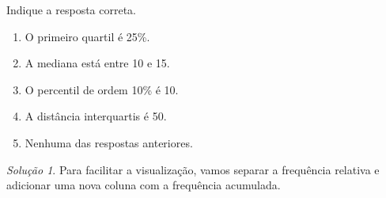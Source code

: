 \documentclass[
]{latex/krantz}
\providecommand{\tightlist}{%
  \setlength{\itemsep}{0pt}\setlength{\parskip}{0pt}}
\theoremstyle{definition}
\theoremstyle{definition}
\theoremstyle{definition}
\theoremstyle{definition}
\theoremstyle{remark}
\newtheorem*{solution}{Solução}
\begin{document}
Indique a resposta correta.

\begin{enumerate}
\def\labelenumi{\alph{enumi})}
\tightlist
\item
  O primeiro quartil é 25\%.
\item
  A mediana está entre 10 e 15.
\item
  O percentil de ordem 10\% é 10.
\item
  A distância interquartis é 50.
\item
  Nenhuma das respostas anteriores.
\end{enumerate}

\begin{solution}

Para facilitar a visualização, vamos separar a frequência relativa e adicionar uma nova coluna com a frequência acumulada.


\end{solution}
\end{document}
